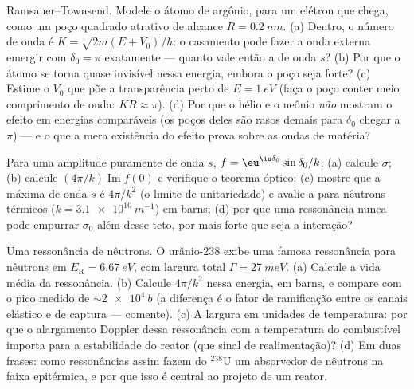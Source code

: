 \begin{exercise}[$\star\star$]\label{exo:b3:scattering-theory:8}
Ramsauer--Townsend. Modele o átomo de argônio, para um elétron que
chega, como um poço quadrado atrativo de alcance $R =
\qty{0.2}{nm}$. (a) Dentro, o número de onda é $K =
\sqrt{2m(E + V_0)}/\hbar$: o casamento pode fazer a onda externa emergir
com $\delta_0 = \pi$ exatamente --- quanto vale então a 
de onda $s$? (b) Por que o átomo se torna quase invisível nessa energia,
embora o poço seja forte? (c) Estime o $V_0$ que põe a transparência
perto de $E = \qty{1}{eV}$ (faça o poço conter meio comprimento de
onda: $KR \approx \pi$). (d) Por que o hélio e o neônio \emph{não}
mostram o efeito em energias comparáveis (os poços deles são rasos
demais para $\delta_0$ chegar a $\pi$) --- e o que a mera existência do
efeito prova sobre as ondas de matéria?
\end{exercise}

\begin{exercise}[$\star\star$]\label{exo:b3:scattering-theory:9}
Para uma amplitude puramente de onda $s$,
$f = \eu^{\iu\delta_0}\sin\delta_0/
k$: (a) calcule $\sigma$; (b) calcule $(4\pi/k)\operatorname{Im}
f(0)$ e verifique o teorema óptico; (c) mostre que a 
máxima de onda $s$ é $4\pi/k^2$ (o limite de unitariedade) e avalie-a
para nêutrons térmicos ($k = \qty{3.1e10}{m^{-1}}$) em barns; (d) por
que uma ressonância nunca pode empurrar $\sigma_0$ além desse teto, por
mais forte que seja a interação?
\end{exercise}

\begin{exercise}[$\star\star\star$]\label{exo:b3:scattering-theory:10}
Uma ressonância de nêutrons. O urânio-238 exibe uma famosa ressonância
para nêutrons em $E_{\text{R}} = \qty{6.67}{eV}$, com largura total
$\Gamma = \qty{27}{meV}$. (a) Calcule a vida média da ressonância.
(b) Calcule $4\pi/k^2$ nessa energia, em barns, e compare com o pico
medido de $\sim\qty{2e4}{b}$ (a diferença é o fator de ramificação
entre os canais elástico e de captura --- comente). (c) A largura em
unidades de temperatura: por que o alargamento Doppler dessa
ressonância com a temperatura do combustível importa para a
estabilidade do reator (que sinal de realimentação)? (d) Em duas
frases: como ressonâncias assim fazem do $^{238}$U um absorvedor de
nêutrons na faixa epitérmica, e por que isso é central ao projeto de um
reator.
\end{exercise}

